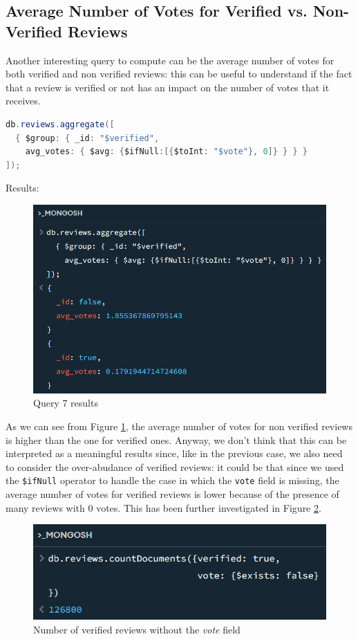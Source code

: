 \newpage
\subsection{Average Number of Votes for Verified vs. Non-Verified Reviews}
Another interesting query to compute can be the average number of votes for both verified and non verified reviews: this can be useful to understand if the fact that a review is verified or not has an impact on the number of votes that it receives. \\
\begin{lstlisting}[language=Java]
db.reviews.aggregate([
  { $group: { _id: "$verified", 
    avg_votes: { $avg: {$ifNull:[{$toInt: "$vote"}, 0]} } } }
]);
\end{lstlisting}
Results:
\begin{figure}[H]
  \centering
  \includegraphics[scale=0.7]{Images/q7_result.png}
  \caption{Query 7 results}
  \label{fig:q7_result}
\end{figure}
As we can see from Figure \ref{fig:q7_result}, the average number of votes for non verified reviews is higher than the one for verified ones. 
Anyway, we don't think that this can be interpreted as a meaningful results since, like in the previous case, we also need to consider the over-abudance of verified reviews: it could be that since we used the \texttt{\$ifNull} operator to handle the case in which the \texttt{vote} field is missing, the average number of votes for verified reviews is lower because of the presence of many reviews with 0 votes.
This has been further investigated in Figure \ref{fig:q7_result_spec}. \\
\begin{figure}[H]
  \centering
  \includegraphics[scale=0.7]{Images/q7_result_spec.png}
  \caption{Number of verified reviews without the \textit{vote} field}
  \label{fig:q7_result_spec}
\end{figure}

